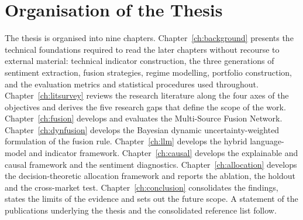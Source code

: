 \section{Organisation of the Thesis}

The thesis is organised into nine chapters. Chapter~\ref{ch:background} presents the technical
foundations required to read the later chapters without recourse to external material:
technical indicator construction, the three generations of sentiment extraction, fusion
strategies, regime modelling, portfolio construction, and the evaluation metrics and
statistical procedures used throughout. Chapter~\ref{ch:litsurvey} reviews the research
literature along the four axes of the objectives and derives the five research gaps that
define the scope of the work. Chapter~\ref{ch:fusion} develops and evaluates the Multi-Source
Fusion Network. Chapter~\ref{ch:dynfusion} develops the Bayesian dynamic uncertainty-weighted
formulation of the fusion rule. Chapter~\ref{ch:llm} develops the hybrid language-model and
indicator framework. Chapter~\ref{ch:causal} develops the explainable and causal framework and
the sentiment diagnostics. Chapter~\ref{ch:allocation} develops the decision-theoretic
allocation framework and reports the ablation, the holdout and the cross-market test.
Chapter~\ref{ch:conclusion} consolidates the findings, states the limits of the evidence and
sets out the future scope. A statement of the publications underlying the thesis and the
consolidated reference list follow.

